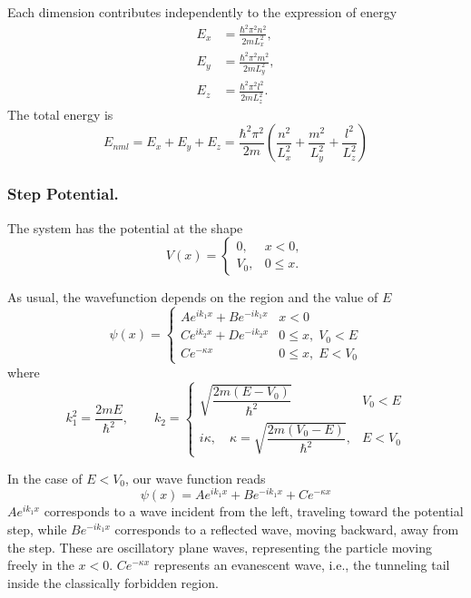 \documentclass[../../../main.tex]{subfiles}
\begin{document}
Each dimension contributes independently to the expression of energy
\begin{align*}
  E_x & = \frac{\hbar^2 \pi^2 n^2}{2 m L_x^2}, \\
  E_y & = \frac{\hbar^2 \pi^2 m^2}{2 m L_y^2}, \\
  E_z & = \frac{\hbar^2 \pi^2 l^2}{2 m L_z^2}.
\end{align*}
The total energy is
\begin{equation*}
  E_{nml} = E_x + E_y + E_z = \frac{\hbar^2 \pi^2}{2 m} \left( \frac{n^2}{L_x^2} + \frac{m^2}{L_y^2} + \frac{l^2}{L_z^2} \right)
\end{equation*}

\subsubsection{Step Potential.}
The system has the potential at the shape
\begin{equation*}
  V(x) =
  \begin{cases}
    0,   & x < 0,   \\
    V_0, & 0\leq x.
  \end{cases}
\end{equation*}

As usual, the wavefunction depends on the region and the value of $E$
\begin{equation*}
  \psi(x)=
  \begin{cases}
    A e^{i k_1 x} + B e^{-i k_1 x} & x <0                \\
    C e^{i k_2 x} + D e^{-i k_2 x} & 0 \leq x,\; V_0 < E \\
    C e^{-\kappa x}                & 0 \leq x,\;E < V_0
  \end{cases}
\end{equation*}
where
\begin{equation*}
  k_1^2 =\frac{2 m E}{\hbar^2}    ,
  \qquad
  k_2 =
  \begin{cases}
    \sqrt{\dfrac{2 m (E - V_0)}{\hbar^2}}                           & V_0<E   \\
    i \kappa, \quad \kappa = \sqrt{\dfrac{2 m (V_0 - E)}{\hbar^2}}, & E < V_0
  \end{cases}
\end{equation*}

In the case of $E<V_0$, our wave function reads
\begin{equation*}
  \psi(x)=Ae^{ik_1x}+Be^{-ik_1x}+Ce^{-\kappa x}
\end{equation*}
$Ae^{ik_1x}$ corresponds to a wave incident from the left, traveling toward the potential step, while $Be^{-ik_1x}$ corresponds to a reflected wave, moving backward, away from the step.
These are oscillatory plane waves, representing the particle moving freely in the $x<0$.
$Ce^{-\kappa x}$ represents an evanescent wave, i.e., the tunneling tail inside the classically forbidden region.
\end{document}
